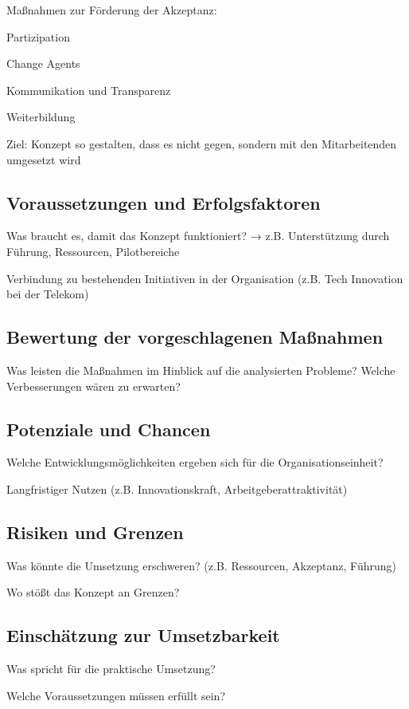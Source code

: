 \documentclass[12pt,a4paper]{article}
\begin{document}
	Maßnahmen zur Förderung der Akzeptanz:
	
	Partizipation
	
	Change Agents
	
	Kommunikation und Transparenz
	
	Weiterbildung
	
	Ziel: Konzept so gestalten, dass es nicht gegen, sondern mit den Mitarbeitenden umgesetzt wird
	
	\subsection{Voraussetzungen und Erfolgsfaktoren}
	Was braucht es, damit das Konzept funktioniert?
	→ z.B. Unterstützung durch Führung, Ressourcen, Pilotbereiche
	
	Verbindung zu bestehenden Initiativen in der Organisation (z.B. Tech  Innovation bei der Telekom)
	\subsection{Bewertung der vorgeschlagenen Maßnahmen}
	
	Was leisten die Maßnahmen im Hinblick auf die analysierten Probleme?
	Welche Verbesserungen wären zu erwarten?
	\subsection{Potenziale und Chancen}
	Welche Entwicklungsmöglichkeiten ergeben sich für die Organisationseinheit?
	
	Langfristiger Nutzen (z.B. Innovationskraft, Arbeitgeberattraktivität)
	\subsection{Risiken und Grenzen}
	Was könnte die Umsetzung erschweren? (z.B. Ressourcen, Akzeptanz, Führung)
	
	Wo stößt das Konzept an Grenzen?
	
	\subsection{Einschätzung zur Umsetzbarkeit}
	Was spricht für die praktische Umsetzung?
	
	Welche Voraussetzungen müssen erfüllt sein?
	
	\newpage
	\printbibliography[heading=bibintoc,title={Literaturverzeichnis}]
	
\end{document}
